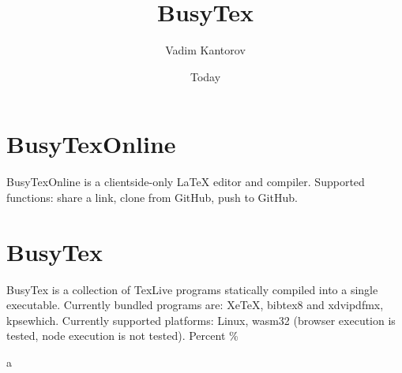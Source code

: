\documentclass[11pt]{article}
\begin{document}
\title{BusyTex}
\author{Vadim Kantorov}
\date{Today}
\maketitle

\section{BusyTexOnline}
BusyTexOnline is a clientside-only LaTeX editor and compiler. Supported functions: share a link, clone from GitHub, push to GitHub. 

\section{BusyTex}
BusyTex is a collection of TexLive programs statically compiled into a single executable. Currently bundled programs are: XeTeX, bibtex8 and xdvipdfmx, kpsewhich. Currently supported platforms: Linux, wasm32 (browser execution is tested, node execution is not tested). Percent \%

a%
\end{document}

